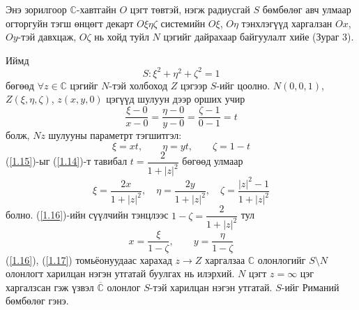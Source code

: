 Энэ зорилгоор $\mathbb{C}$-хавтгайн $O$ цэгт төвтэй, нэгж радиусгай $S$ бөмбөлөг авч улмаар огторгуйн тэгш өнцөгт декарт  $O\xi \eta \zeta$ системийн $O\xi$, $O\eta$ тэнхлэгүүд харгалзан $Ox$, $Oy$-тэй давхцаж, $O\zeta$ нь хойд туйл $N$ цэгийг дайрахаар байгуулалт хийе (Зураг 3). 
\begin{figure}[h]
    \centering
    \label{fig:my_label}
\end{figure}
Иймд 
\begin{equation} \label{1.14}
S:\xi ^2+\eta^2+\zeta^2=1
\end{equation}
бөгөөд $\forall z\in\mathbb{C}$ цэгийг $N$-тэй холбоход $Z$ цэгээр $S$-ийг цоолно. $N(0,0,1)$,$Z(\xi, \eta, \zeta)$, $z(x,y,0)$ цэгүүд  шулуун дээр орших учир $$\dfrac{\xi-0}{x-0}=\dfrac{\eta -0}{y-0}=\dfrac{\zeta-1}{0-1}=t$$ болж, $Nz$ шулууны параметрт тэгшитгэл:
\begin{equation} \label{1.15}
\xi=xt, \qquad \eta =yt,\qquad \zeta =1-t
\end{equation}
(\ref{1.15})-ыг (\ref{1.14})-т тавибал $t=\dfrac{2}{1+|z|^2}$ бөгөөд улмаар
\begin{equation} \label{1.16}
\xi=\dfrac{2x}{1+|z|^2}, \quad \eta= \dfrac{2y}{1+|z|^2}, \quad \zeta=\dfrac{|z|^2-1}{1+|z|^2}
\end{equation}
болно. (\ref{1.16})-ийн сүүлчийн тэнцлээс $1-\zeta =\dfrac{2}{1+|z|^2}$ тул 
\begin{equation} \label{1.17}
x=\dfrac{\xi}{1-\zeta}, \qquad y=\dfrac{\eta}{1-\zeta}
\end{equation}
(\ref{1.16}), (\ref{1.17}) томьёонуудаас харахад $z\rightarrow Z$ харгалзаа $\mathbb{C}$ олонлогийг $S\setminus N$ олонлогт харилцан нэгэн утгатай буулгах нь илэрхий. $N$ цэгт $z=\infty$ цэг харгалзсан гэж үзвэл  $\overline{\mathbb{C}}$ олонлог $S$-тэй харилцан нэгэн утгатай. $S$-ийг Риманий бөмбөлөг  гэнэ.

